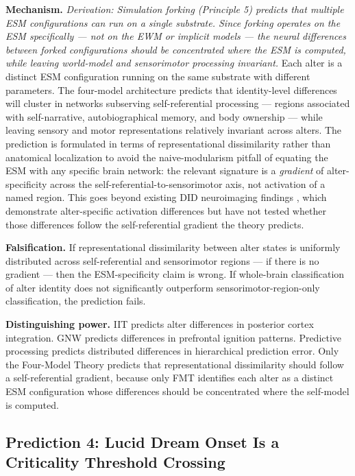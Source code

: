 \documentclass[12pt]{article}
\begin{document}
\textbf{Mechanism.} \emph{Derivation: Simulation forking (Principle 5) predicts that multiple ESM configurations can run on a single substrate. Since forking operates on the ESM specifically --- not on the EWM or implicit models --- the neural differences between forked configurations should be concentrated where the ESM is computed, while leaving world-model and sensorimotor processing invariant.} Each alter is a distinct ESM configuration running on the same substrate with different parameters. The four-model architecture predicts that identity-level differences will cluster in networks subserving self-referential processing --- regions associated with self-narrative, autobiographical memory, and body ownership --- while leaving sensory and motor representations relatively invariant across alters. The prediction is formulated in terms of representational dissimilarity rather than anatomical localization to avoid the naive-modularism pitfall of equating the ESM with any specific brain network: the relevant signature is a \emph{gradient} of alter-specificity across the self-referential-to-sensorimotor axis, not activation of a named region. This goes beyond existing DID neuroimaging findings \citep{Reinders2003,Reinders2008,Schlumpf2014}, which demonstrate alter-specific activation differences but have not tested whether those differences follow the self-referential gradient the theory predicts.

\textbf{Falsification.} If representational dissimilarity between alter states is uniformly distributed across self-referential and sensorimotor regions --- if there is no gradient --- then the ESM-specificity claim is wrong. If whole-brain classification of alter identity does not significantly outperform sensorimotor-region-only classification, the prediction fails.

\textbf{Distinguishing power.} IIT predicts alter differences in posterior cortex integration. GNW predicts differences in prefrontal ignition patterns. Predictive processing predicts distributed differences in hierarchical prediction error. Only the Four-Model Theory predicts that representational dissimilarity should follow a self-referential gradient, because only FMT identifies each alter as a distinct ESM configuration whose differences should be concentrated where the self-model is computed.


\subsection{Prediction 4: Lucid Dream Onset Is a Criticality Threshold Crossing}
\end{document}
